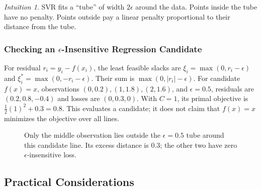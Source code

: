 \documentclass[11pt,twoside]{article}
\numberwithin{equation}{section}
\theoremstyle{plain}
\theoremstyle{definition}
\theoremstyle{remark}
\newtheorem{intuition}[theorem]{Intuition}
\begin{document}
\begin{intuition}
SVR fits a ``tube'' of width $2\epsilon$ around the data. Points inside the tube have no penalty. Points outside pay a linear penalty proportional to their distance from the tube.
\end{intuition}

\subsubsection{Checking an \texorpdfstring{$\epsilon$}{epsilon}-Insensitive Regression Candidate}
For residual $r_i=y_i-f(x_i)$, the least feasible slacks are $\xi_i=\max(0,r_i-\epsilon)$ and $\xi_i^*=\max(0,-r_i-\epsilon)$. Their sum is $\max(0,|r_i|-\epsilon)$. For candidate $f(x)=x$, observations $(0,0.2),(1,1.8),(2,1.6)$, and $\epsilon=0.5$, residuals are $(0.2,0.8,-0.4)$ and losses are $(0,0.3,0)$. With $C=1$, its primal objective is $\tfrac12(1)^2+0.3=0.8$. This evaluates a candidate; it does not claim that $f(x)=x$ minimizes the objective over all lines.

\begin{figure}[H]
\centering
{}
\caption{Only the middle observation lies outside the $\epsilon=0.5$ tube around this candidate line. Its excess distance is $0.3$; the other two have zero $\epsilon$-insensitive loss.}
\end{figure}

\subsection{Practical Considerations}
\end{document}
